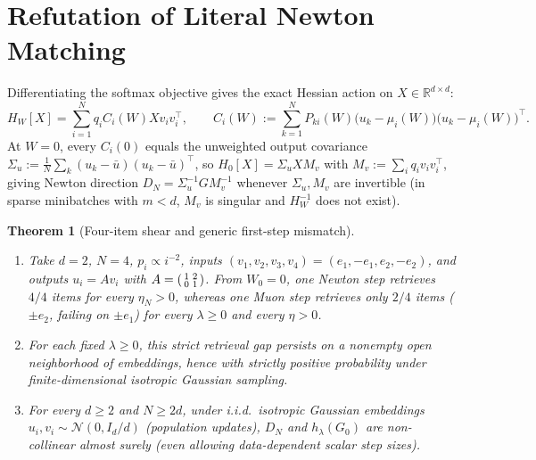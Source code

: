 \documentclass[11pt]{article}
\theoremstyle{plain}
\newtheorem{theorem}{Theorem}
\theoremstyle{definition}
\theoremstyle{remark}
\begin{document}
\section{Refutation of Literal Newton Matching}

Differentiating the softmax objective gives the exact Hessian action on $X \in \mathbb{R}^{d \times d}$:
\[
H_W[X] = \sum_{i=1}^N q_i C_i(W) X v_i v_i^\top,
\qquad
C_i(W) := \sum_{k=1}^N P_{ki}(W)\bigl(u_k - \mu_i(W)\bigr)\bigl(u_k - \mu_i(W)\bigr)^\top.
\]
At $W = 0$, every $C_i(0)$ equals the unweighted output covariance $\Sigma_u := \frac{1}{N}\sum_k (u_k - \bar u)(u_k - \bar u)^\top$, so $H_0[X] = \Sigma_u X M_v$ with $M_v := \sum_i q_i v_i v_i^\top$, giving Newton direction $D_N = \Sigma_u^{-1} G M_v^{-1}$ whenever $\Sigma_u, M_v$ are invertible (in sparse minibatches with $m < d$, $M_v$ is singular and $H_W^{-1}$ does not exist).

\begin{theorem}[Four-item shear and generic first-step mismatch]\label{thm:shear}
\begin{enumerate}[label=\textup{(\arabic*)}]
\item Take $d = 2$, $N = 4$, $p_i \propto i^{-2}$, inputs $(v_1, v_2, v_3, v_4) = (e_1, -e_1, e_2, -e_2)$, and outputs $u_i = A v_i$ with $A = \begin{psmallmatrix} 1 & 2 \\ 0 & 1 \end{psmallmatrix}$. From $W_0 = 0$, one Newton step retrieves $4/4$ items for every $\eta_N > 0$, whereas one Muon step retrieves only $2/4$ items ($\pm e_2$, failing on $\pm e_1$) for every $\lambda \ge 0$ and every $\eta > 0$.
\item For each fixed $\lambda \ge 0$, this strict retrieval gap persists on a nonempty open neighborhood of embeddings, hence with strictly positive probability under finite-dimensional isotropic Gaussian sampling.
\item For every $d \ge 2$ and $N \ge 2d$, under i.i.d.\ isotropic Gaussian embeddings $u_i, v_i \sim \mathcal{N}(0, I_d/d)$ (population updates), $D_N$ and $h_\lambda(G_0)$ are non-collinear almost surely (even allowing data-dependent scalar step sizes).
\end{enumerate}
\end{theorem}
\end{document}
